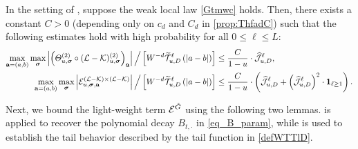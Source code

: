 \begin{lemma}\label{lem:newKLK} 
In the setting of , suppose the weak local law \eqref{Gtmwc} holds. Then, there exists a constant $C>0$ (depending only on $c_d$ and $C_d$ in \eqref{prop:ThfadC}) such that the following estimates hold with high probability for all $0\le \ell \le L$:
\begin{align}\label{juwo2=klk}      
\max_{{\mathbf{a}}=(a,b)} \max_{{\boldsymbol{\sigma}}}\left|{\left({\varTheta^{(2)}_{u,{\boldsymbol{\sigma}}}\circ({\mathcal L}-{\mathcal K})^{(2)}_{u,{\boldsymbol{\sigma}}}}\right)_{{{\mathbf{a}}}}}\right|\Big/\left[{W^{-d}\widetilde{{\mathcal T}}^{\ell}_{u,D}\left({|a-b|}\right)}\right] & \le  \frac{C}{1-u}\cdot  \widehat{\mathcal J}^{\ell}_{u, D }  ,\\
\label{juwo=Lklk}      
\max_{{\mathbf{a}}=(a,b)}\max_{{\boldsymbol{\sigma}}} \left|\mathcal{E}^{(\mathcal{L} - \mathcal{K}) \times (\mathcal{L} - \mathcal{K})}_{u, {\boldsymbol{\sigma}}, {{\mathbf{a}}}} \right|\Big/\left[{W^{-d}\widetilde{{\mathcal T}}^{\ell}_{u,D}\left({ |a-b|}\right)}\right] &\le  \frac{C}{1-u} \cdot \left( \widehat{\mathcal J}^{\ell}_{u,D} + \left(\widehat{\mathcal J}^{\ell}_{u,D} \right)^2\cdot {\bf 1}_{\ell\ge 1}\right)  .
\end{align}  
\end{lemma}


Next, we bound the light-weight term $\mathcal E^{{\mathring G}}$ using the following two lemmas.  is applied to recover the polynomial decay $B_{t,\cdot}$ in \eqref{eq_B_param}, while  is used to establish the tail behavior described by the tail function in \eqref{defWTTlD}.

 
